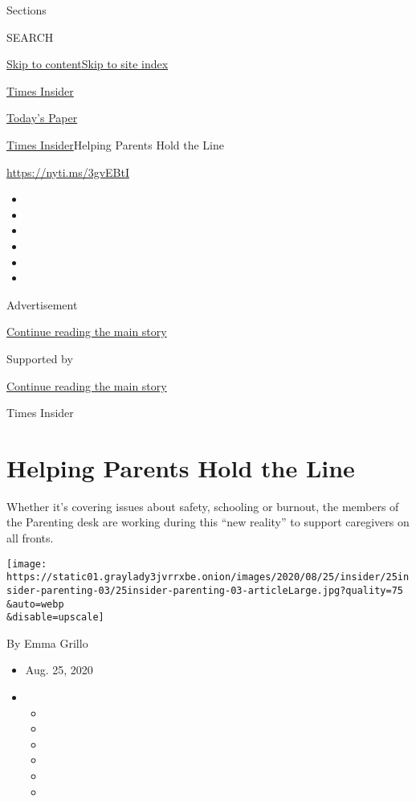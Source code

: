 Sections

SEARCH

\protect\hyperlink{site-content}{Skip to
content}\protect\hyperlink{site-index}{Skip to site index}

\href{https://www.nytimes3xbfgragh.onion/section/reader-center}{Times
Insider}

\href{https://myaccount.nytimes3xbfgragh.onion/auth/login?response_type=cookie\&client_id=vi}{}

\href{https://www.nytimes3xbfgragh.onion/section/todayspaper}{Today's
Paper}

\href{/section/reader-center}{Times Insider}\textbar{}Helping Parents
Hold the Line

\url{https://nyti.ms/3gvEBtI}

\begin{itemize}
\item
\item
\item
\item
\item
\item
\end{itemize}

Advertisement

\protect\hyperlink{after-top}{Continue reading the main story}

Supported by

\protect\hyperlink{after-sponsor}{Continue reading the main story}

Times Insider

\hypertarget{helping-parents-hold-the-line}{%
\section{Helping Parents Hold the
Line}\label{helping-parents-hold-the-line}}

Whether it's covering issues about safety, schooling or burnout, the
members of the Parenting desk are working during this ``new reality'' to
support caregivers on all fronts.

\texttt{[image: https://static01.graylady3jvrrxbe.onion/images/2020/08/25/insider/25insider-parenting-03/25insider-parenting-03-articleLarge.jpg?quality=75\\\&auto=webp\\\&disable=upscale]}

By Emma Grillo

\begin{itemize}
\item
  Aug. 25, 2020
\item
  \begin{itemize}
  \item
  \item
  \item
  \item
  \item
  \item
  \end{itemize}
\end{itemize}

